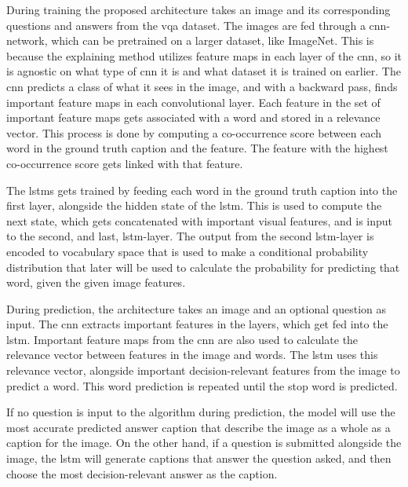 During training the proposed architecture takes an image and its corresponding questions and answers from the \gls{vqa} dataset. The images are fed through a \gls{cnn}-network, which can be pretrained on a larger dataset, like ImageNet\cite{dengImageNetLargeScaleHierarchical2009}. This is because the explaining method utilizes feature maps in each layer of the \gls{cnn}, so it is agnostic on what type of \gls{cnn} it is and what dataset it is trained on earlier. The \gls{cnn} predicts a class of what it sees in the image, and with a backward pass, finds important feature maps in each  convolutional layer. Each feature in the set of important feature maps gets associated with a word and stored in a relevance vector. This process is done by computing a co-occurrence score between each word in the ground truth caption and the feature. The feature with the highest co-occurrence score gets linked with that feature. 

The \glspl{lstm} gets trained by feeding each word in the ground truth caption into the first layer, alongside the hidden state of the \gls{lstm}. This is used to compute the next state, which gets concatenated with important visual features, and is input to the second, and last, \gls{lstm}-layer. 
The output from the second \gls{lstm}-layer is encoded to vocabulary space that is used to make a conditional probability distribution that later will be used to calculate the probability for predicting that word, given the given image features. 

During prediction, the architecture takes an image and an optional question as input. The \gls{cnn} extracts important features in the layers, which get fed into the \gls{lstm}. Important feature maps from the \gls{cnn} are also used to calculate the relevance vector between features in the image and words. The \gls{lstm} uses this relevance vector, alongside important decision-relevant features from the image to predict a word. This word prediction is repeated until the stop word is predicted. 

If no question is input to the algorithm during prediction, the model will use the most accurate predicted answer caption that describe the image as a whole as a caption for the image. On the other hand, if a question is submitted alongside the image, the \gls{lstm} will generate captions that answer the question asked, and then choose the most decision-relevant answer as the caption. 



